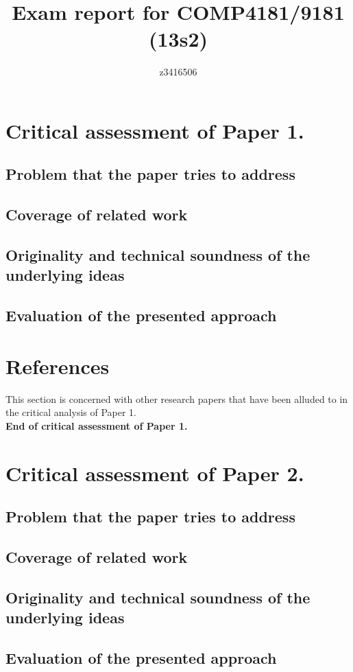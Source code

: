 \documentclass[9pt,twocolumn]{article}
\title{Exam report for COMP4181/9181 (13s2)}
\author{z3416506}
\date{}
\begin{document}
\maketitle
\clearpage

\section*{Critical assessment of Paper 1.}
\subsection*{Problem that the paper tries to address}
\subsection*{Coverage of related work}
\subsection*{Originality and technical soundness of the underlying ideas}
\subsection*{Evaluation of the presented approach}
\section*{References}
This section is concerned with other research papers that have been alluded to in the critical analysis of Paper 1.\\

\noindent
{\bf End of critical assessment of Paper 1.}
\clearpage
\section*{Critical assessment of Paper 2.}
\subsection*{Problem that the paper tries to address}
\subsection*{Coverage of related work}
\subsection*{Originality and technical soundness of the underlying ideas}
\subsection*{Evaluation of the presented approach}
\end{document}

